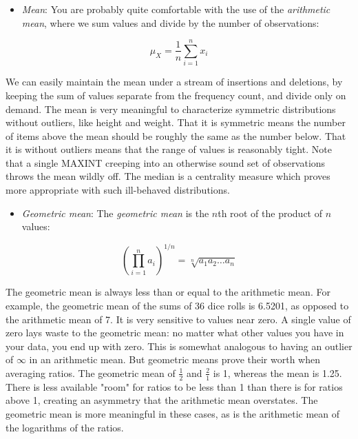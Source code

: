 \documentclass[10pt]{article}
\begin{document}
\begin{itemize}
  \item \textit{Mean}: You are probably quite comfortable with the use of the \textit{arithmetic mean}, where we sum values and divide by the number of observations:
\end{itemize}

\[
\mu_{X} = \frac{1}{n} \sum_{i=1}^{n} x_{i}
\]

We can easily maintain the mean under a stream of insertions and deletions, by keeping the sum of values separate from the frequency count, and divide only on demand. The mean is very meaningful to characterize symmetric distributions without outliers, like height and weight. That it is symmetric means the number of items above the mean should be roughly the same as the number below. That it is without outliers means that the range of values is reasonably tight. Note that a single MAXINT creeping into an otherwise sound set of observations throws the mean wildly off. The median is a centrality measure which proves more appropriate with such ill-behaved distributions.

\begin{itemize}
  \item \textit{Geometric mean}: The \textit{geometric mean} is the \(n\)th root of the product of \(n\) values:
\end{itemize}

\[
\left(\prod_{i=1}^{n} a_{i}\right)^{1 / n} = \sqrt[n]{a_{1} a_{2} \ldots a_{n}}
\]

The geometric mean is always less than or equal to the arithmetic mean. For example, the geometric mean of the sums of 36 dice rolls is 6.5201, as opposed to the arithmetic mean of 7. It is very sensitive to values near zero. A single value of zero lays waste to the geometric mean: no matter what other values you have in your data, you end up with zero. This is somewhat analogous to having an outlier of \(\infty\) in an arithmetic mean. But geometric means prove their worth when averaging ratios. The geometric mean of \(\frac{1}{2}\) and \(\frac{2}{1}\) is 1, whereas the mean is 1.25. There is less available "room" for ratios to be less than 1 than there is for ratios above 1, creating an asymmetry that the arithmetic mean overstates. The geometric mean is more meaningful in these cases, as is the arithmetic mean of the logarithms of the ratios.
\end{document}
